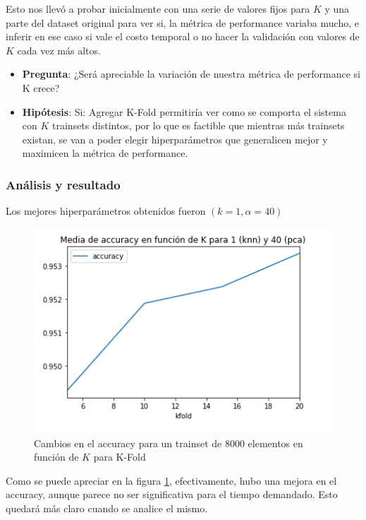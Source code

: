 Esto nos llevó a probar inicialmente con una serie de valores fijos para $K$ y una parte del dataset original para ver si, la métrica de performance variaba mucho, e inferir en ese caso si vale el costo temporal o no hacer la validación con valores de $K$ cada vez más altos.

\begin{itemize}
    \item \textbf{Pregunta}: ¿Será apreciable la variación de nuestra métrica de performance si K crece?
    \item \textbf{Hipótesis}: Si: Agregar K-Fold permitiría ver como se comporta el sistema con $K$ trainsets distintos, por lo que es factible que mientras más trainsets existan, se van a poder elegir hiperparámetros que generalicen mejor y maximicen la métrica de performance.
\end{itemize}

\subsubsection*{Análisis y resultado}

Los mejores hiperparámetros obtenidos fueron $(k = 1, \alpha = 40)$

\begin{figure}[H]
    \centering
    \includegraphics[scale=0.7]{images/KFoldIncreasingK.png}
    \caption{Cambios en el accuracy para un trainset de 8000 elementos en función de $K$ para K-Fold}
    \label{fig:KFoldIncreasingK}
\end{figure}

Como se puede apreciar en la figura \ref{fig:KFoldIncreasingK}, efectivamente, hubo una mejora en el accuracy, aunque parece no ser significativa para el tiempo demandado. Esto quedará más claro cuando se analice el mismo.

